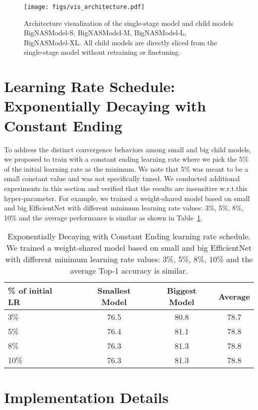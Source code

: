\documentclass[runningheads]{llncs}
\def\onedot{.}
\def\wrt{w.r.t\onedot} \def\dof{d.o.f\onedot}
\begin{document}
\begin{figure}[ht]
\centering
\texttt{[image: figs/vis\_architecture.pdf]}
\caption{Architecture visualization of the single-stage model and child models BigNASModel-S, BigNASModel-M, BigNASModel-L, BigNASModel-XL. All child models are directly sliced from the single-stage model without retraining or finetuning.}
\label{figs:vis_architecture}
\end{figure}

\section{Learning Rate Schedule: Exponentially Decaying with Constant Ending}
To address the distinct convergence behaviors among small and big child models, we proposed to train with a constant ending learning rate where we pick the 5\% of the initial learning rate as the minimum. We note that 5\% was meant to be a small constant value and was not specifically tuned. We conducted additional experiments in this section and verified that the results are insensitive \wrt this hyper-parameter. For example, we trained a weight-shared model based on small and big EfficientNet with different minimum learning rate values: 3\%, 5\%, 8\%, 10\% and the average performance is similar as shown in Table~\ref{tabs:learning_rate}.

\begin{table}[ht]
\centering
\caption{Exponentially Decaying with Constant Ending learning rate schedule. We trained a weight-shared model based on small and big EfficientNet with different minimum learning rate values: 3\%, 5\%, 8\%, 10\% and the average Top-1 accuracy is similar.}
\begin{tabular}{@{}l c  c  c  c @{}} \toprule
\% of initial LR & & Smallest Model  & Biggest Model & Average \\
\midrule
3\% && 76.5 & 80.8 & 78.7\\
5\% && 76.4 & 81.1 & 78.8\\
8\% && 76.3 & 81.3 & 78.8\\
10\% && 76.3 & 81.3 & 78.8\\
\bottomrule
\end{tabular}
\label{tabs:learning_rate}
\end{table} 
\section{Implementation Details}
\end{document}
